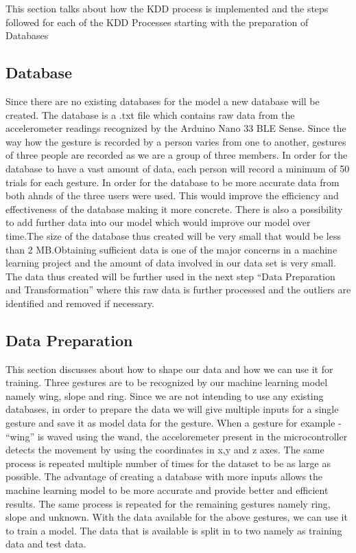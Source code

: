 This section talks about how the KDD process is implemented and the steps followed for each of the KDD Processes starting with the preparation of Databases

\subsection{Database}

Since there are no existing databases for the model a new database will be created. The database is a .txt file which contains raw data from the accelerometer  readings recognized by the Arduino Nano 33 BLE Sense. Since the way how the gesture is recorded by a person varies from one to another, gestures of three people are recorded as we are a group of three members. In order for the database to have a vast amount of data, each person will record a minimum of 50 trials for each gesture. In order for the database to be more accurate data from both ahnds of the three users were used. This would improve the efficiency and  effectiveness of the database making it more concrete. There is also a possibility to add further data into our model which would improve our model over time.The size of the database thus created will be very small that would be less than 2 MB.Obtaining sufficient data is one of the major concerns in a machine learning project and the amount of data involved in our data set is very small. The data thus created will be further used in the next step ``Data Preparation and Transformation'' where this raw data is further processed and the outliers are identified and removed if necessary. \cite{Warden:2020}

\subsection{Data Preparation}

This section discusses about how to shape our data and how we can use it for training. Three gestures are to be recognized by our machine learning model namely wing, slope and ring. Since we are not intending to use any existing databases,  in order to prepare the data we will give multiple inputs for a single gesture and save it as model data for the gesture. When a gesture for example - ``wing'' is waved using the wand, the acceloremeter present in the microcontroller detects the movement by using the coordinates in x,y and z axes. The same process is repeated multiple number of times for the dataset to be as large as possible. The advantage of creating a database with more inputs allows the machine learning model to be more accurate and provide better and efficient results. The same process is repeated for the remaining gestures namely ring, slope and unknown.
With the data available for the above gestures, we can use it to train a model. The data that is available is split in to two namely as training data and test data.

